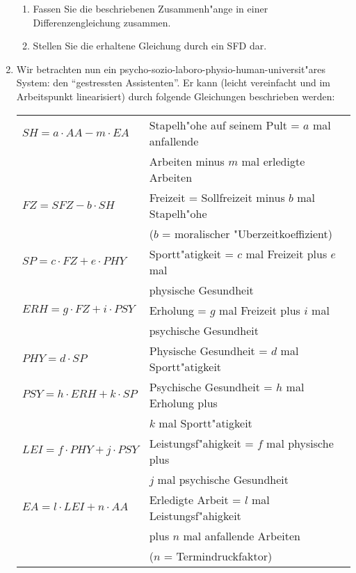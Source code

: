 \begin{enumerate}
  \begin{enumerate}
  \item Fassen Sie die beschriebenen Zusammenh"ange in einer
    Differenzengleichung zusammen.

  \item Stellen Sie die erhaltene Gleichung durch ein SFD dar.
  \end{enumerate}
  
\item Wir betrachten nun ein
  psycho-sozio-laboro-physio-human-universit"ares System: den
  ``gestressten Assistenten''. Er kann (leicht vereinfacht und im
  Arbeitspunkt linearisiert) durch folgende Gleichungen beschrieben
  werden:

  \begin{tabular}{ll}

    $SH = a \cdot AA - m \cdot EA$ & Stapelh"ohe auf seinem Pult = 
     $a$ mal anfallende \\ & Arbeiten minus $m$ mal erledigte Arbeiten \\

    $FZ = SFZ - b \cdot SH$ & Freizeit = Sollfreizeit minus $b$ mal
    Stapelh"ohe\\ & ($b$ = moralischer "Uberzeitkoeffizient) \\ 

    $SP = c \cdot FZ + e \cdot PHY$ & Sportt"atigkeit = $c$ mal
    Freizeit plus $e$ mal\\ & physische Gesundheit \\ 

    $ERH = g \cdot FZ + i \cdot PSY$ & Erholung = $g$ mal Freizeit
    plus $i$ mal\\ & psychische Gesundheit \\ 

    $PHY = d \cdot SP$ & Physische Gesundheit = $d$ mal
    Sportt"atigkeit \\ 

    $PSY = h \cdot ERH + k \cdot SP$ & Psychische Gesundheit = $h$ mal
    Erholung plus  \\ & $k$ mal Sportt"atigkeit \\ 

    $LEI = f \cdot PHY + j \cdot PSY$ & Leistungsf"ahigkeit = $f$ mal
    physische plus \\ & $j$ mal psychische Gesundheit\\ 

    $EA = l \cdot LEI + n \cdot AA$ & Erledigte Arbeit = $l$ mal
    Leistungsf"ahigkeit \\ &  plus $n$ mal anfallende Arbeiten \\ &($n$ =
    Termindruckfaktor)
  \end{tabular}


\end{enumerate}
